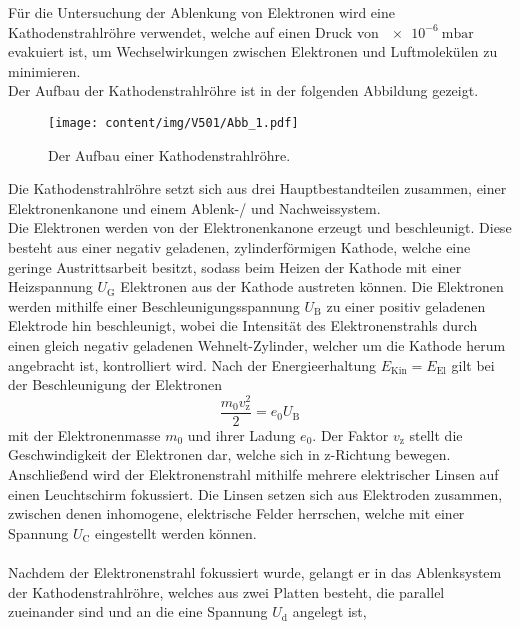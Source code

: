     Für die Untersuchung der Ablenkung von Elektronen wird eine Kathodenstrahlröhre verwendet,
    welche auf einen Druck von $\SI{e-6}{\milli\bar}$ evakuiert ist,
    um Wechselwirkungen zwischen Elektronen und Luftmolekülen zu minimieren.\\
    Der Aufbau der Kathodenstrahlröhre ist in der folgenden Abbildung gezeigt.
    \begin{figure}[H]
        \centering
        \texttt{[image: content/img/V501/Abb\_1.pdf]}
        \caption{Der Aufbau einer Kathodenstrahlröhre.}
        \label{fig:kathodenstrahlröhre_querschnitt}
    \end{figure}
    Die Kathodenstrahlröhre setzt sich aus drei Hauptbestandteilen zusammen,
    einer Elektronenkanone und einem Ablenk-/ und Nachweissystem.\\
    Die Elektronen werden von der Elektronenkanone erzeugt und beschleunigt.
    Diese besteht aus einer negativ geladenen, zylinderförmigen Kathode,
    welche eine geringe Austrittsarbeit besitzt,
    sodass beim Heizen der Kathode mit einer Heizspannung $U_\text{G}$ Elektronen aus der Kathode austreten können.
    Die Elektronen werden mithilfe einer Beschleunigungsspannung $U_\text{B}$ zu einer positiv geladenen Elektrode hin beschleunigt,
    wobei die Intensität des Elektronenstrahls durch einen gleich negativ geladenen Wehnelt-Zylinder,
    welcher um die Kathode herum angebracht ist,
    kontrolliert wird.
    Nach der Energieerhaltung $E_\text{Kin} = E_\text{El}$ gilt bei der Beschleunigung der Elektronen
    \begin{equation}
        \frac{m_0 v^2_\text{z}}{2} = e_0 U_\text{B}
        \label{eqn:energieerhaltung_beschleunigung}
    \end{equation} 
    mit der Elektronenmasse $m_0$ und ihrer Ladung $e_0$.
    Der Faktor $v_\text{z}$ stellt die Geschwindigkeit der Elektronen dar, 
    welche sich in z-Richtung bewegen.
    Anschließend wird der Elektronenstrahl mithilfe mehrere elektrischer Linsen auf einen Leuchtschirm fokussiert.
    Die Linsen setzen sich aus Elektroden zusammen,
    zwischen denen inhomogene,
    elektrische Felder herrschen,
    welche mit einer Spannung $U_\text{C}$ eingestellt werden können.\\
    \\
    Nachdem der Elektronenstrahl fokussiert wurde,
    gelangt er in das Ablenksystem der Kathodenstrahlröhre,
    welches aus zwei Platten besteht,
    die parallel zueinander sind und an die eine Spannung $U_\text{d}$ angelegt ist,
